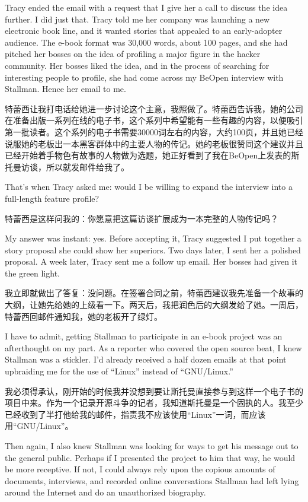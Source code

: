 \ifdefined\eng
Tracy ended the email with a request that I give her a call to discuss the idea further. I did just that. Tracy told me her company was launching a new electronic book line, and it wanted stories that appealed to an early-adopter audience. The e-book format was 30,000 words, about 100 pages, and she had pitched her bosses on the idea of profiling a major figure in the hacker community. Her bosses liked the idea, and in the process of searching for interesting people to profile, she had come across my BeOpen interview with Stallman. Hence her email to me.
\fi

\ifdefined\chs
特蕾西让我打电话给她进一步讨论这个主意，我照做了。特蕾西告诉我，她的公司在准备出版一系列在线的电子书，这个系列中希望能有一些有趣的内容，以便吸引第一批读者。这个系列的电子书需要30000词左右的内容，大约100页，并且她已经说服她的老板出一本黑客群体中的主要人物的传记。她的老板很赞同这个建议并且已经开始着手物色有故事的人物做为选题，她正好看到了我在BeOpen上发表的斯托曼访谈，所以就发邮件给我了。
\fi

\ifdefined\eng
That's when Tracy asked me: would I be willing to expand the interview into a full-length feature profile?
\fi

\ifdefined\chs
特蕾西是这样问我的：你愿意把这篇访谈扩展成为一本完整的人物传记吗？
\fi

\ifdefined\eng
My answer was instant: yes. Before accepting it, Tracy suggested I put together a story proposal she could show her superiors. Two days later, I sent her a polished proposal. A week later, Tracy sent me a follow up email. Her bosses had given it the green light.
\fi

\ifdefined\chs
我立即就做出了答复：没问题。在签署合同之前，特蕾西建议我先准备一个故事的大纲，让她先给她的上级看一下。两天后，我把润色后的大纲发给了她。一周后，特蕾西回邮件通知我，她的老板开了绿灯。
\fi

\ifdefined\eng
I have to admit, getting Stallman to participate in an e-book project was an afterthought on my part. As a reporter who covered the open source beat, I knew Stallman was a stickler. I'd already received a half dozen emails at that point upbraiding me for the use of ``Linux'' instead of ``GNU/Linux.''
\fi

\ifdefined\chs
我必须得承认，刚开始的时候我并没想到要让斯托曼直接参与到这样一个电子书的项目中来。作为一个记录开源斗争的记者，我知道斯托曼是一个固执的人。我至少已经收到了半打他给我的邮件，指责我不应该使用“Linux”一词，而应该用“GNU/Linux”。
\fi

\ifdefined\eng
Then again, I also knew Stallman was looking for ways to get his message out to the general public. Perhaps if I presented the project to him that way, he would be more receptive. If not, I could always rely upon the copious amounts of documents, interviews, and recorded online conversations Stallman had left lying around the Internet and do an unauthorized biography.
\fi

